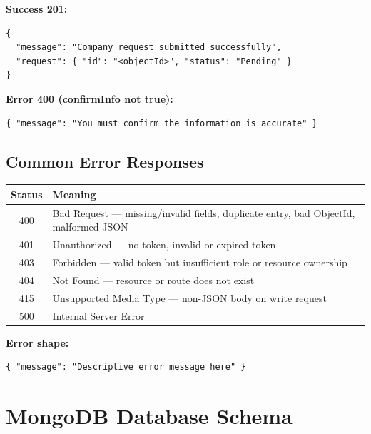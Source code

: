 \documentclass[12pt,a4paper]{article}
\begin{document}
\textbf{Success 201:}
\begin{lstlisting}[language={}]
{
  "message": "Company request submitted successfully",
  "request": { "id": "<objectId>", "status": "Pending" }
}
\end{lstlisting}

\textbf{Error 400 (confirmInfo not true):}
\begin{lstlisting}[language={}]
{ "message": "You must confirm the information is accurate" }
\end{lstlisting}

\vspace{0.5cm}

\subsection*{Common Error Responses}

\begin{center}
\begin{tabular}{cl}
  \toprule
  \textbf{Status} & \textbf{Meaning} \\
  \midrule
  400 & Bad Request — missing/invalid fields, duplicate entry, bad ObjectId, malformed JSON \\
  401 & Unauthorized — no token, invalid or expired token \\
  403 & Forbidden — valid token but insufficient role or resource ownership \\
  404 & Not Found — resource or route does not exist \\
  415 & Unsupported Media Type — non-JSON body on write request \\
  500 & Internal Server Error \\
  \bottomrule
\end{tabular}
\end{center}

\textbf{Error shape:}
\begin{lstlisting}[language={}]
{ "message": "Descriptive error message here" }
\end{lstlisting}

\newpage

\section{MongoDB Database Schema}
\end{document}
